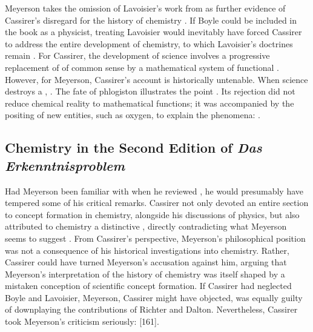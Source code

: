 \documentclass[submitted,12pt]{article}
\begin{document}
Meyerson takes the omission of Lavoisier's work from \EPt as further evidence of Cassirer's disregard for the history of chemistry \citep[103]{Meyerson1911}.  If Boyle could be included in the book as a physicist, treating Lavoisier would inevitably have forced Cassirer to address the entire development of chemistry, to which Lavoisier's doctrines remain  \citep[103]{Meyerson1911}. For Cassirer, the development of science involves a progressive replacement of  of common sense by a mathematical system of functional . However, for Meyerson, Cassirer's account is historically untenable. When science destroys a ,   \citep[129]{Meyerson1911}. The fate of phlogiston illustrates the point \citep[see][203]{Meyerson1908}. Its rejection did not reduce chemical reality to mathematical functions; it was accompanied by the positing of new entities, such as oxygen, to explain the phenomena:  \citep[129]{Meyerson1911}. 

\subsection{Chemistry in the Second Edition of \emph{Das Erkenntnisproblem}}
%
Had Meyerson been familiar with \SFt when he reviewed \EPt, he would presumably have tempered some of his critical remarks. Cassirer not only devoted an entire section to concept formation in chemistry, alongside his discussions of physics, but also attributed to chemistry a distinctive , directly contradicting what Meyerson seems to suggest . From Cassirer's perspective, Meyerson's philosophical position was not a consequence of his historical investigations into chemistry. Rather, Cassirer could have turned Meyerson's accusation against him, arguing that Meyerson's interpretation of the history of chemistry was itself shaped by a mistaken conception of scientific concept formation. If Cassirer had neglected Boyle and Lavoisier, Meyerson, Cassirer might have objected, was equally guilty of downplaying the contributions of Richter and Dalton. Nevertheless, Cassirer took Meyerson's criticism seriously:  [161].
\end{document}
